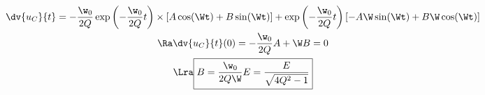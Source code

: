 \documentclass[../../main/main.tex]{subfiles}
\begin{document}
\begin{tcb}[label=demo:solupseudoper, breakable]
\begin{itemize}
{\begin{gather*}
				      \dv{u_C}{t} =
				      -\frac{\w_0}{2Q}\exp \left( -\frac{\w_0}{2Q}t \right)\times
				      \left[ A\cos(\Wt) + B\sin(\Wt) \right] +
				      \exp \left( -\frac{\w_0}{2Q}t \right)
				      \left[ -A\W\sin(\Wt) + B\W\cos(\Wt) \right]
				      \\\Ra
				      \dv{u_C}{t}\/(0) = - \frac{\w_0}{2Q}A + \W B = 0
				      \\\Lra
				      \boxed{B = \frac{\w_0}{2Q\W}E = \frac{E}{\sqrt{4Q^2-1}}}
			      \end{gather*}
		      }
	\end{itemize}
\end{tcb}
\end{document}
